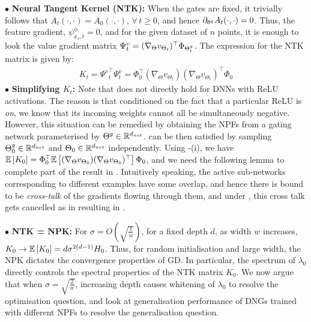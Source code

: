 $\bullet$ \textbf{Neural Tangent Kernel (NTK):} When the gates are fixed, it trivially follows that $A_t(\cdot,\cdot)=A_0(\cdot,\cdot),\,\forall\,t\geq 0$, and hence $\partial_{\theta^g} A_t(\cdot,\cdot)=0$. Thus, the feature gradient, $\psi^{\phi}_{x_s,t}=0$, and for the given dataset of $n$ points, it is enough to look the value gradient matrix $\Psi^v_t=(\nabla_{\Theta}v_{\Theta_t})^\top \Phi_{{\Theta}^g_t}$. The expression for the NTK matrix is given by:
\begin{align}\label{eq:kt}
K_t={\Psi^v}^\top_t\Psi^v_t= \Phi^\top_0(\nabla_{\Theta}v_{\Theta_t})(\nabla_{\Theta}v_{\Theta_t})^\top \Phi_0
\end{align}
$\bullet$ \textbf{Simplifying $K_t$:} Note that  does not directly hold for DNNs with ReLU activations. The reason is that conditioned on the fact that a particular ReLU is \emph{on}, we know that its incoming weights cannot all be simultaneously negative. However, this situation can be remedied by obtaining the NPFs from a gating network parameterised by ${\Theta}^g\in\mathbb{R}^{d_{net}}$.   can be then satisfied by sampling ${\Theta}^g_0\in\mathbb{R}^{d_{net}}$ and $\Theta_0\in\mathbb{R}^{d_{net}}$ independently. Using -(i), we have $\mathbb{E}\left[K_0\right]=\Phi^\top_0\mathbb{E}\left[(\nabla_{\Theta}v_{\Theta_0})(\nabla_{\Theta}v_{\Theta_0})^\top\right]\Phi_0$, and we need the following lemma to complete part of the result in . Intuitively speaking, the active sub-networks corresponding to different examples have some overlap, and hence there is bound to be \emph{cross-talk} of the gradients flowing through them, and under , this cross talk gets cancelled as in  resulting in .

$\bullet$ \textbf{NTK = NPK:} For $\sigma=O\left(\sqrt{\frac{1}{w}}\right)$, for a fixed depth $d$, as width $w$ increases, $K_0\rightarrow\mathbb{E}\left[K_0\right]=d\sigma^{2(d-1)}H_0$. Thus, for random initialisation and large width, the NPK dictates the convergence properties of GD. In particular, the spectrum of $\lambda_0$ directly controls the spectral properties of the NTK matrix $K_0$. We now argue that when $\sigma=\sqrt{\frac{2}{w}}$, increasing depth causes whitening of $\lambda_0$ to resolve the optimisation question, and look at generalisation performance of DNGs trained with different NPFs to resolve the generalisation question.

